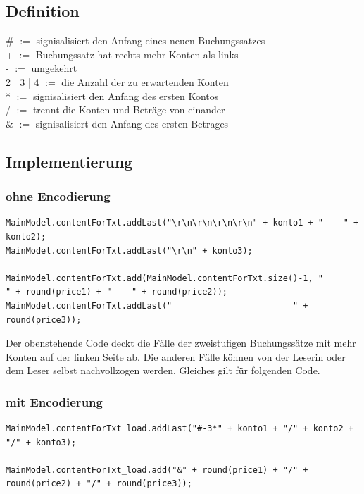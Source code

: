 \documentclass[12pt]{report}
\begin{document}
\subsection{Definition}
\# $:=$ signisalisiert den Anfang eines neuen Buchungssatzes\\
+ $:=$ Buchungssatz hat rechts mehr Konten als links\\
- $:=$ umgekehrt\\
2 | 3 | 4 $:=$ die Anzahl der zu erwartenden Konten\\
* $:=$ signisalisiert den Anfang des ersten Kontos\\
/ $:=$ trennt die Konten und Beträge von einander\\
\& $:=$ signisalisiert den Anfang des ersten Betrages\\

\subsection{Implementierung}

\subsubsection{ohne Encodierung}
\begin{lstlisting}
MainModel.contentForTxt.addLast("\r\n\r\n\r\n\r\n" + konto1 + "    " + konto2);
MainModel.contentForTxt.addLast("\r\n" + konto3);

MainModel.contentForTxt.add(MainModel.contentForTxt.size()-1, "                " + round(price1) + "    " + round(price2));
MainModel.contentForTxt.addLast("                        " + round(price3));
\end{lstlisting}

\noindent Der obenstehende Code deckt die Fälle der zweistufigen Buchungssätze mit mehr Konten auf der linken Seite ab. Die anderen Fälle können von der Leserin oder dem Leser selbst nachvollzogen werden. Gleiches gilt für folgenden Code.\\

\subsubsection{mit Encodierung}
\begin{lstlisting}
MainModel.contentForTxt_load.addLast("#-3*" + konto1 + "/" + konto2 + "/" + konto3);

MainModel.contentForTxt_load.add("&" + round(price1) + "/" + round(price2) + "/" + round(price3));
\end{lstlisting}
\end{document}
